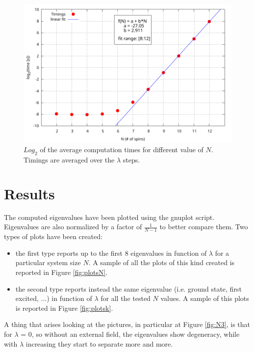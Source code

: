 \documentclass[11pt,a4paper]{article}
\begin{document}
\begin{figure}
	\centering
	\includegraphics[width=0.75\linewidth]{Timings.pdf}
	\caption{$Log_2$ of the average computation times for different value of $N$. Timings are averaged over the $\lambda$ steps.}
	\label{fig:timings}
\end{figure}

\section{Results} %

The computed eigenvalues have been plotted using the gnuplot script. Eigenvalues are also normalized by a factor of $\frac{1}{N-1}$ to better compare them. Two types of plots have been created: 
\begin{itemize}
	\item the first type reports up to the first $8$ eigenvalues in function of $\lambda$ for a particular system size $N$. A sample of all the plots of this kind created is reported in Figure \ref{fig:plotsN}. 
	\item the second type reports instead the same eigenvalue (i.e. ground state, first excited, ...) in function of $\lambda$ for all the tested $N$ values. A sample of this plots is reported in Figure \ref{fig:plotsk}.
\end{itemize}
A thing that arises looking at the pictures, in particular at Figure \ref{fig:N3}, is that for $\lambda$ = 0, so without an external field, the eigenvalues show degeneracy, while with $\lambda$ increasing they start to separate more and more. 
\end{document}
